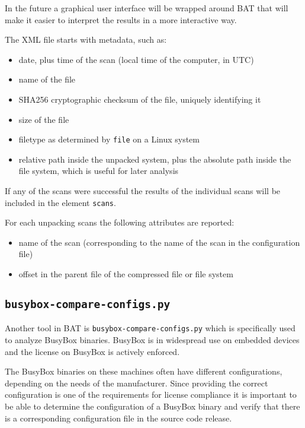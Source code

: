 \documentclass[10pt]{article}
\begin{document}
In the future a graphical user interface will be wrapped around BAT that will
make it easier to interpret the results in a more interactive way.

The XML file starts with metadata, such as:

\begin{itemize}
\item date, plus time of the scan (local time of the computer, in UTC)
\item name of the file
\item SHA256 cryptographic checksum of the file, uniquely identifying it
\item size of the file
\item filetype as determined by \texttt{file} on a Linux system
\item relative path inside the unpacked system, plus the absolute path inside
the file system, which is useful for later analysis
\end{itemize}

If any of the scans were successful the results of the individual scans will
be included in the element \texttt{scans}.

For each unpacking scans the following attributes are reported:

\begin{itemize}
\item name of the scan (corresponding to the name of the scan in the
configuration file)
\item offset in the parent file of the compressed file or file system
\end{itemize}

\subsection{\texttt{busybox-compare-configs.py}}

Another tool in BAT is \texttt{busybox-compare-configs.py} which is specifically
used to analyze BusyBox binaries. BusyBox is in widespread use on embedded
devices and the license on BusyBox is actively enforced.

The BusyBox binaries on these machines often have different configurations,
depending on the needs of the manufacturer. Since providing the correct
configuration is one of the requirements for license compliance it is important
to be able to determine the configuration of a BusyBox binary and verify that
there is a corresponding configuration file in the source code release.
\end{document}

